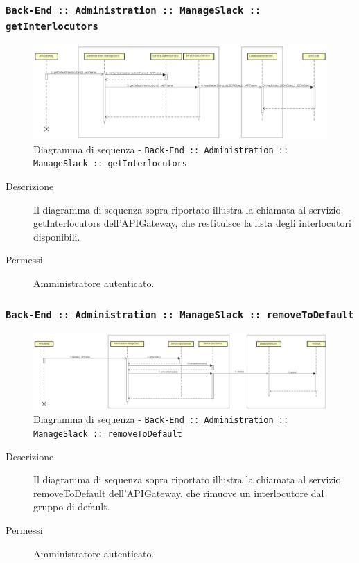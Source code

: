 \documentclass[../DefinizioneDiProdotto_v2.0.0.tex]{subfiles}
\begin{document}
\newpage
\subsubsection{\texttt{Back-End :: Administration :: ManageSlack :: getInterlocutors}}
\begin{figure}[!h]
	\centering
	\includegraphics[scale=0.3]{DiagrammiSequenza/Back-End/manageSlack/getInterlocutors.png}
	\caption{Diagramma di sequenza - \texttt{Back-End :: Administration :: ManageSlack :: getInterlocutors}}
\end{figure}
\begin{description}
	\item [Descrizione] Il diagramma di sequenza sopra riportato illustra la chiamata al servizio getInterlocutors dell'APIGateway, che restituisce la lista degli interlocutori disponibili.
	\item [Permessi] Amministratore autenticato.
\end{description}

\subsubsection{\texttt{Back-End :: Administration :: ManageSlack :: removeToDefault}}
\begin{figure}[!h]
	\centering
	\includegraphics[scale=0.3]{DiagrammiSequenza/Back-End/manageSlack/removeToDefault.png}
	\caption{Diagramma di sequenza - \texttt{Back-End :: Administration :: ManageSlack :: removeToDefault }}
\end{figure}
\begin{description}
	\item [Descrizione] Il diagramma di sequenza sopra riportato illustra la chiamata al servizio removeToDefault dell'APIGateway, che rimuove un interlocutore dal gruppo di default.
	\item [Permessi] Amministratore autenticato.
\end{description}
\end{document}
